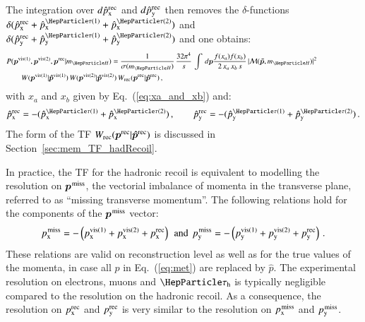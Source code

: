 The integration over $d\hat{p}_{\textrm{x}}^{\textrm{rec}}$ and $d\hat{p}_{\textrm{y}}^{\textrm{rec}}$ then removes the $\delta$-functions 
$\delta( \pXhat^{\rec} + \pXhat^{\Pgt(1)} + \pXhat^{\Pgt(2)} )$ and
$\delta( \pYhat^{\rec} + \pYhat^{\Pgt(1)} + \pYhat^{\Pgt(2)} )$ and one obtains:
\begin{align}
& P(\bm{p}^{\vis(1)},\bm{p}^{\vis(2)},\bm{p}^{\rec}|m_{\PHiggs}) = \frac{1}{\sigma(m_{\PHiggs})} \, \frac{32\pi^{4}}{s} \, \int \, d\bm{p} 
\frac{f(x_{a}) f(x_{b})}{2 \, x_{a} \, x_{b} \, s} \, \vert \mathcal{M}(\bm{\tilde{p}},m_{\PHiggs}) \vert^{2} \, \hspace{2cm} \nonumber \\
& \qquad W(\bm{p}^{\vis(1)}|\bm{\hat{p}}^{\vis(1)}) \, W(\bm{p}^{\vis(2)}|\bm{\hat{p}}^{\vis(2)}) \, W_{\rec}( \bm{p}^{\rec} | \phat^{\rec} ) \, ,
\label{eq:mem_with_hadRecoil}
\end{align}
with $x_{a}$ and $x_{b}$ given by Eq.~(\ref{eq:xa_and_xb}) and:
\begin{equation}
\pXhat^{\rec} = -(\pXhat^{\Pgt(1)} + \pXhat^{\Pgt(2)}) \, ,
\qquad \pYhat^{\rec} = -(\pYhat^{\Pgt(1)} + \pYhat^{\Pgt(2)}) \, .
\label{eq:xpXhat_and_pYhat}
\end{equation}
The form of the TF $W_{\textrm{rec}}( \bm{p}^{\textrm{rec}} | \bm{\hat{p}}^{\textrm{rec}} )$ is
discussed in Section~\ref{sec:mem_TF_hadRecoil}.

In practice, the TF for the hadronic recoil is equivalent to modelling
the resolution on $\bm{p}^{\textrm{\kern0.10em miss}}$, the vectorial imbalance of momenta in the
transverse plane, referred to as ``missing transverse momentum''.
The following relations hold for the components of the $\bm{p}^{\textrm{\kern0.10em miss}}$
vector:
\begin{equation}
p_{\textrm{x}}^{\textrm{\kern0.10em miss}} = - \left( p_{\textrm{x}}^{\textrm{vis}(1)} + p_{\textrm{x}}^{\textrm{vis}(2)} + p_{\textrm{x}}^{\textrm{rec}} \right)
\, \mbox { and } \,
p_{\textrm{y}}^{\textrm{\kern0.10em miss}} = - \left( p_{\textrm{y}}^{\textrm{vis}(1)} + p_{\textrm{y}}^{\textrm{vis}(2)} + p_{\textrm{y}}^{\textrm{rec}} \right) \, .
\label{eq:met}
\end{equation}
These relations are valid on reconstruction level as well as for the true values of the momenta, \ie in case all $p$ in Eq.~(\ref{eq:met}) are replaced by $\hat{p}$.
The experimental resolution on electrons, muons and $\tauh$ is typically negligible compared to the resolution on the hadronic recoil.
As a consequence, the resolution on $p_{\textrm{x}}^{\textrm{rec}}$ and $p_{\textrm{y}}^{\textrm{rec}}$ is
very similar to the resolution on $p_{\textrm{x}}^{\textrm{\kern0.10em miss}}$ and $p_{\textrm{y}}^{\textrm{\kern0.10em miss}}$.

